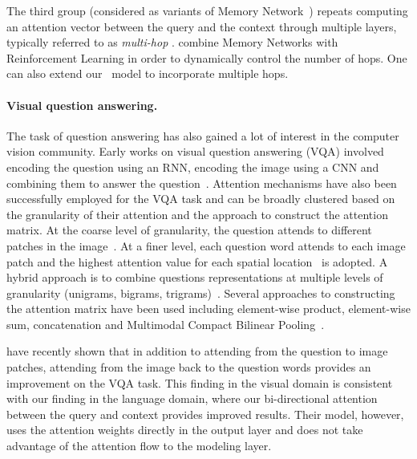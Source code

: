 The third group (considered as variants of Memory Network~\citep{memnn}) repeats computing an attention vector between the query and the context through multiple layers, typically referred to as \emph{multi-hop} \citep{iterative,ga}. %
\cite{reasonet} combine Memory Networks with Reinforcement Learning in order to dynamically control the number of hops. One can also extend our \sysshort\ model to incorporate multiple hops.

\paragraph{Visual question answering.}
The task of question answering has also gained a lot of interest in the computer vision community. Early works on visual question answering (VQA) involved encoding the question using an RNN, encoding the image using a CNN and combining them to answer the question~\citep{antol2015vqa,Malinowski2015AskYN}. Attention mechanisms have also been successfully employed for the VQA task and can be broadly clustered based on the granularity of their attention and the approach to construct the attention matrix. At the coarse level of granularity, the question attends to different patches in the image~\citep{Zhu2015Visual7WGQ,xiong2016dynamic}. At a finer level, each question word attends to each image patch and the highest attention value for each spatial location~\citep{Xu2016AskAA} is adopted. A hybrid approach is to combine questions representations at multiple levels of granularity (unigrams, bigrams, trigrams)~\citep{yang2015stacked}. Several approaches to constructing the attention matrix have been used including element-wise product, element-wise sum, concatenation and Multimodal Compact Bilinear Pooling~\citep{fukui2016multimodal}.

\citet{lu2016hierarchical} have recently shown that in addition to attending from the question to image patches, attending from the image back to the question words provides an improvement on the VQA task. This finding in the visual domain is consistent with our finding in the language domain, where our bi-directional attention between the query and context provides improved results. 
Their model, however, uses the attention weights directly in the output layer and does not take advantage of the attention flow to the modeling layer. 

